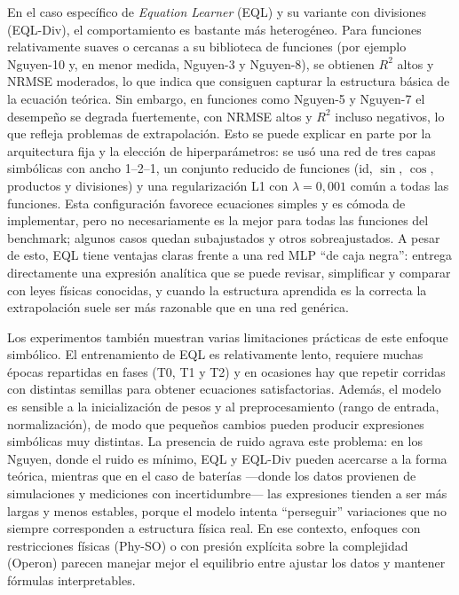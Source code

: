 En el caso específico de \textit{Equation Learner} (EQL) y su variante con divisiones (EQL-Div), el comportamiento es bastante más heterogéneo. Para funciones relativamente suaves o cercanas a su biblioteca de funciones (por ejemplo Nguyen-10 y, en menor medida, Nguyen-3 y Nguyen-8), se obtienen $R^2$ altos y NRMSE moderados, lo que indica que consiguen capturar la estructura básica de la ecuación teórica. Sin embargo, en funciones como Nguyen-5 y Nguyen-7 el desempeño se degrada fuertemente, con NRMSE altos y $R^2$ incluso negativos, lo que refleja problemas de extrapolación. Esto se puede explicar en parte por la arquitectura fija y la elección de hiperparámetros: se usó una red de tres capas simbólicas con ancho 1–2–1, un conjunto reducido de funciones (id, $\sin$, $\cos$, productos y divisiones) y una regularización L1 con $\lambda = 0{,}001$ común a todas las funciones. Esta configuración favorece ecuaciones simples y es cómoda de implementar, pero no necesariamente es la mejor para todas las funciones del benchmark; algunos casos quedan subajustados y otros sobreajustados. A pesar de esto, EQL tiene ventajas claras frente a una red MLP “de caja negra”: entrega directamente una expresión analítica que se puede revisar, simplificar y comparar con leyes físicas conocidas, y cuando la estructura aprendida es la correcta la extrapolación suele ser más razonable que en una red genérica.

Los experimentos también muestran varias limitaciones prácticas de este enfoque simbólico. El entrenamiento de EQL es relativamente lento, requiere muchas épocas repartidas en fases (T0, T1 y T2) y en ocasiones hay que repetir corridas con distintas semillas para obtener ecuaciones satisfactorias. Además, el modelo es sensible a la  inicialización de pesos y al preprocesamiento (rango de entrada, normalización), de modo que pequeños cambios pueden producir expresiones simbólicas muy distintas. La presencia de ruido agrava este problema: en los Nguyen, donde el ruido es mínimo, EQL y EQL-Div pueden acercarse a la forma teórica, mientras que en el caso de baterías —donde los datos provienen de simulaciones y mediciones con incertidumbre— las expresiones tienden a ser más largas y menos estables, porque el modelo intenta “perseguir” variaciones que no siempre corresponden a estructura física real. En ese contexto, enfoques con restricciones físicas (Phy-SO) o con presión explícita sobre la complejidad (Operon) parecen manejar mejor el equilibrio entre ajustar los datos y mantener fórmulas interpretables.


